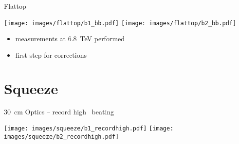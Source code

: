 \documentclass[11pt,usenames,dvipsnames,aspectratio=169]{beamer}
\begin{document}
\begin{frame}{Flattop}
    
    \texttt{[image: images/flattop/b1\_bb.pdf]}
    \hfill
    \texttt{[image: images/flattop/b2\_bb.pdf]}
    \begin{itemize}
        \item measurements at \SI{6.8}{TeV} performed
        \item first step for corrections
    \end{itemize}
    
\end{frame}

\section{Squeeze}


\begin{frame}{\SI{30}{cm} Optics -- record high \beta~beating}

    \texttt{[image: images/squeeze/b1\_recordhigh.pdf]}
    \hfill
    \texttt{[image: images/squeeze/b2\_recordhigh.pdf]}
    
\end{frame}
\end{document}
